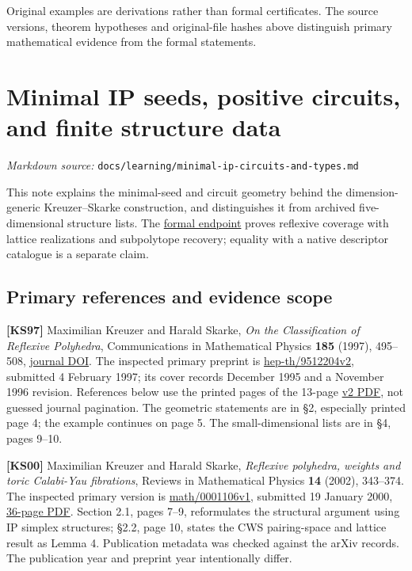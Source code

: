 \documentclass[11pt,a4paper,oneside]{report}
\begin{document}
Original examples are derivations rather than formal certificates. The
source versions, theorem hypotheses and original-file hashes above
distinguish primary mathematical evidence from the formal statements.

\chapter{Minimal IP seeds, positive circuits, and finite structure
data}\label{minimal-ip-circuits-and-types--minimal-ip-seeds-positive-circuits-and-finite-structure-data}

\noindent\textit{Markdown source: }\texttt{docs/\allowbreak{}learning\allowbreak{}/\allowbreak{}minimal-\allowbreak{}ip-\allowbreak{}circuits\allowbreak{}-\allowbreak{}and-\allowbreak{}types.\allowbreak{}md}

This note explains the minimal-seed and circuit geometry behind the
dimension-generic Kreuzer--Skarke construction, and distinguishes it
from archived five-dimensional structure lists. The
\href{../../proofs/STATEMENTS.md}{formal endpoint} proves reflexive
coverage with lattice realizations and subpolytope recovery; equality
with a native descriptor catalogue is a separate claim.

\section{Primary references and evidence
scope}\label{minimal-ip-circuits-and-types--primary-references-and-evidence-scope}

\textbf{{[}KS97{]}} Maximilian Kreuzer and Harald Skarke, \emph{On the
Classification of Reflexive Polyhedra}, Communications in Mathematical
Physics \textbf{185} (1997), 495--508,
\href{https://doi.org/10.1007/s002200050100}{journal DOI}. The inspected
primary preprint is
\href{https://arxiv.org/abs/hep-th/9512204v2}{hep-\allowbreak{}th/\allowbreak{}9512204v\allowbreak{}2},
submitted 4 February 1997; its cover records December 1995 and a
November 1996 revision. References below use the printed pages of the
13-page \href{https://arxiv.org/pdf/hep-th/9512204v2}{v2 PDF}, not
guessed journal pagination. The geometric statements are in §2,
especially printed page 4; the example continues on page 5. The
small-dimensional lists are in §4, pages 9--10.

\textbf{{[}KS00{]}} Maximilian Kreuzer and Harald Skarke,
\emph{Reflexive polyhedra, weights and toric Calabi-Yau fibrations},
Reviews in Mathematical Physics \textbf{14} (2002), 343--374. The
inspected primary version is
\href{https://arxiv.org/abs/math/0001106v1}{math/\allowbreak{}0001106v\allowbreak{}1},
submitted 19 January 2000,
\href{https://arxiv.org/pdf/math/0001106v1}{36-page PDF}. Section 2.1,
pages 7--9, reformulates the structural argument using IP simplex
structures; §2.2, page 10, states the CWS pairing-space and lattice
result as Lemma 4. Publication metadata was checked against the arXiv
records. The publication year and preprint year intentionally differ.
\end{document}

